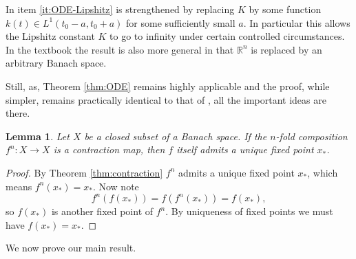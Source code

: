 \documentclass[10pt]{article}
\newtheorem{lem}[thm]{Lemma}
\theoremstyle{definition}
\theoremstyle{remark}
\newcommand{\bbR}{\mathbb{R}}
\begin{document}
In \cite[Theorem 10.6]{Krantz} item \ref{it:ODE-Lipshitz} is strengthened by replacing $K$ by some function $k(t)\in L^1(t_0-a,t_0+a)$ for some sufficiently small $a$. In particular this allows the Lipshitz constant $K$ to go to infinity under certain controlled circumstances. In the textbook the result is also more general in that $\bbR^n$ is replaced by an arbitrary Banach space.

Still, as, Theorem \ref{thm:ODE} remains highly applicable and the proof, while simpler, remains practically identical to that of \cite[Theorem 10.6]{Krantz}, all the important ideas are there.

\begin{lem}
  Let $X$ be a closed subset of a Banach space. If the $n$-fold composition $f^n:X \to X$ is a contraction map, then $f$ itself admits a unique fixed point $x_*$.
\end{lem}
\begin{proof}
  By Theorem \ref{thm:contraction} $f^n$ admits a unique fixed point $x_*$, which means $f^n(x_*)=x_*$. Now note\[
    f^n(f(x_*)) = f(f^n(x_*)) = f(x_*), 
    \] so $f(x_*)$ is another fixed point of $f^n$. By uniqueness of fixed points we must have $f(x_*)=x_*$.
\end{proof}

We now prove our main result.
\end{document}
